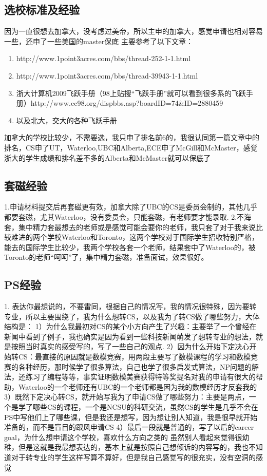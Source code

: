 \documentclass[11pt,fleqn,openany]{book} %
\begin{document}
\subsection*{选校标准及经验}
因为一直很想去加拿大，没考虑过美帝，所以主申的加拿大，感觉申请也相对容易一些，还申了一些美国的master保底
主要参考了以下文章：
\begin{enumerate}
\item http://www.1point3acres.com/bbs/thread-252-1-1.html
\item http://www.1point3acres.com/bbs/thread-39943-1-1.html
\item 浙大计算机2009飞跃手册（98上贴搜“飞跃手册”就可以看到很多系的飞跃手册）http://www.cc98.org/dispbbs.asp?boardID=74\&ID=2880459
\item 以及北大，交大的各种飞跃手册
\end{enumerate}
加拿大的学校比较少，不需要选，我只申了排名前6的，我很认同第一篇文章中的排名，CS申了UT，Waterloo,UBC和Alberta,ECE申了McGill和McMaster，感觉浙大的学生成绩和排名差不多的Alberta和McMaster就可以保底了
\subsection*{套磁经验}
1.申请材料提交后再套磁更有效，加拿大除了UBC的CS是委员会制的，其他几乎都要套磁，尤其Waterloo，没有委员会，只能套磁，有老师要才能录取.
2.不海套，集中精力套最想去的老师或是感觉可能会要你的老师，我只套了对于我来说比较难进的两个学校Waterloo和Toronto，这两个学校对于国际学生招收特别严格，能去的国际学生比较少，我两个学校各套一个老师，结果套中了Waterloo的，被Toronto的老师“呵呵”了，集中精力套磁，准备面试，效果很好。
\subsection*{PS经验}
1. 表达你最想说的，不要雷同，根据自己的情况写，我的情况很特殊，因为要转专业，所以主要围绕了，我为什么想转CS，以及我为了转CS做了哪些努力，大体结构是：
    1）为什么我最初对CS的某个小方向产生了兴趣：主要举了一个曾经在新闻中看到了例子，我也确实是因为看到一些科技新闻萌发了想转专业的想法，就是按照当时真实的感受写的，写了一些自己的观点.
    2）因为什么开始下定决心开始转CS：最直接的原因就是数模竞赛，用两段主要写了数模课程的学习和数模竞赛的各种经历，那时候学了很多算法，自己也学了很多启发式算法，NP问题的解法，还练习了编程等等，事实证明数模美赛获得特等奖提名对我的申请有很大的帮助，Waterloo的一个老师还有UBC的一个老师都是因为我的数模经历才反套我的
    3）既然下定决心转CS，就开始写我为了申请CS做了哪些努力：主要是两点，一个是学了哪些CS的课程，一个是NCSU的科研交流，虽然CS的学生是几乎不会在PS中写他们上了哪些课，但是我还是想写，因为想让别人知道，我是很早就开始准备的，而不是盲目的跟风申请CS
    4）最后一段就是普通的，写了以后的career goal，为什么想申请这个学校，喜欢什么方向之类的
    虽然别人看起来觉得很幼稚，但是这就是我最想表达的，基本上就是按照自己想倾诉的内容写的，我也不知道对于转专业的学生这样写算不算好，但是我自己感觉写的很充实，没有空洞的感觉
\end{document}
